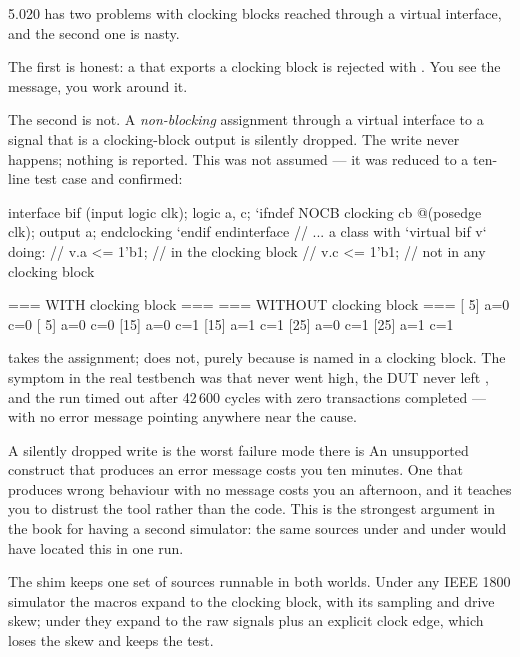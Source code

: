  5.020 has two problems with clocking blocks reached through
a virtual interface, and the second one is nasty.

The first is honest: a  that exports a clocking block is
rejected with . You see the message, you
work around it.

The second is not. A \emph{non-blocking} assignment through a virtual
interface to a signal that is a clocking-block output is silently dropped.
The write never happens; nothing is reported. This was not assumed --- it was
reduced to a ten-line test case and confirmed:

\begin{svcode}
interface bif (input logic clk);
  logic a, c;
`ifndef NOCB
  clocking cb @(posedge clk); output a; endclocking
`endif
endinterface
// ... a class with `virtual bif v` doing:
//        v.a <= 1'b1;   // in the clocking block
//        v.c <= 1'b1;   // not in any clocking block
\end{svcode}

\begin{txtcode}
=== WITH clocking block ===          === WITHOUT clocking block ===
[ 5] a=0 c=0                         [ 5] a=0 c=0
[15] a=0 c=1                         [15] a=1 c=1
[25] a=0 c=1                         [25] a=1 c=1
\end{txtcode}

 takes the assignment;  does not, purely because  is
named in a clocking block. The symptom in the real testbench was that
 never went high, the DUT never left , and the
run timed out after 42\,600 cycles with zero transactions completed --- with
no error message pointing anywhere near the cause.

\begin{gotcha}{A silently dropped write is the worst failure mode there is}
An unsupported construct that produces an error message costs you ten
minutes. One that produces wrong behaviour with no message costs you an
afternoon, and it teaches you to distrust the tool rather than the code. This
is the strongest argument in the book for having a second simulator: the same
sources under  and under  would have located
this in one run.
\end{gotcha}

The shim keeps one set of sources runnable in both worlds. Under any IEEE
1800 simulator the macros expand to the clocking block, with its sampling and
drive skew; under  they expand to the raw signals plus an
explicit clock edge, which loses the skew and keeps the test.

